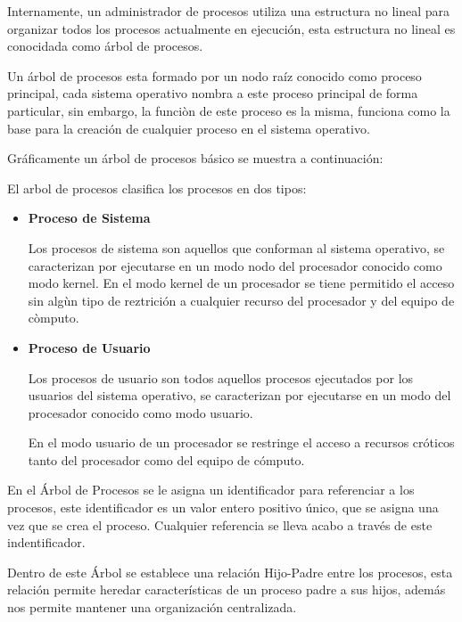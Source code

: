 \documentclass[12pt, fleqn]{report}                             %
\begin{document}
            Internamente, un administrador de procesos utiliza una estructura no lineal para organizar todos
            los procesos actualmente en ejecución, esta estructura no lineal es conocidada como árbol de procesos.

            Un árbol de procesos esta formado por un nodo raíz conocido como proceso principal, cada sistema
            operativo nombra a este proceso principal de forma particular, sin embargo, la funciòn de este proceso
            es la misma, funciona como la base para la creación de cualquier proceso en el sistema operativo.

            Gráficamente un árbol de procesos básico se muestra a continuación: 

            El arbol de procesos clasifica los procesos en dos tipos:

            \begin{itemize}
                \item
                    \textbf{Proceso de Sistema}

                    Los procesos de sistema son aquellos que conforman al sistema operativo, se caracterizan
                    por ejecutarse en un modo nodo del procesador conocido como modo kernel.
                    En el modo kernel de un procesador se tiene permitido el acceso sin algùn tipo de reztrición
                    a cualquier recurso del procesador y del equipo de còmputo.


                \item
                    \textbf{Proceso de Usuario}

                    Los procesos de usuario son todos aquellos procesos ejecutados por los usuarios del sistema
                    operativo, se caracterizan por ejecutarse en un modo del procesador conocido como modo usuario.

                    En el modo usuario de un procesador se restringe el acceso a recursos cróticos tanto del
                    procesador como del equipo de cómputo.

            \end{itemize}

            En el Árbol de Procesos se le asigna un identificador para referenciar a los procesos, este
            identificador es un valor entero positivo único, que se asigna una vez que se crea el proceso.
            Cualquier referencia se lleva acabo a través de este indentificador.

            Dentro de este Árbol se establece una relación Hijo-Padre entre los procesos, esta relación 
            permite heredar características de un proceso padre a sus hijos, además nos permite mantener
            una organización centralizada.
\end{document}
